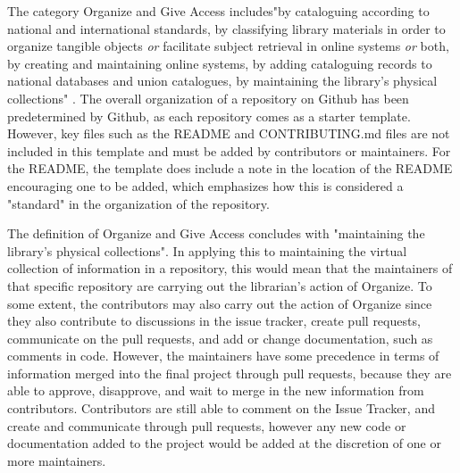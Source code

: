 The category Organize and Give Access includes"by cataloguing according to national and international standards, by classifying library materials in order to organize tangible objects \textit{or} facilitate subject retrieval in online systems \textit{or} both, by creating and maintaining online systems, by adding cataloguing records to national databases and union catalogues, by maintaining the library's physical collections" \cite{gorman2000values}. The overall organization of a repository on Github has been predetermined by Github, as each repository comes as a starter template. However, key files such as the README and CONTRIBUTING.md files are not included in this template and must be added by contributors or maintainers. For the README, the template does include a note in the location of the README encouraging one to be added, which emphasizes how this is considered a "standard" in the organization of the repository. 

The definition of Organize and Give Access concludes with "maintaining the library's physical collections"\cite{gorman2000values}. In applying this to maintaining the virtual collection of information in a repository, this would mean that the maintainers of that specific repository are carrying out the librarian's action of Organize. To some extent, the contributors may also carry out the action of Organize since they also contribute to discussions in the issue tracker, create pull requests, communicate on the pull requests, and add or change documentation, such as comments in code. However, the maintainers have some precedence in terms of information merged into the final project through pull requests, because they are able to approve, disapprove, and wait to merge in the new information from contributors. Contributors are still able to comment on the Issue Tracker, and create and communicate through pull requests, however any new code or documentation added to the project would be added at the discretion of one or more maintainers. 


